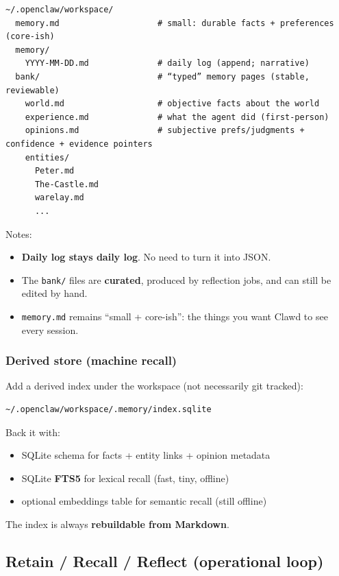 \begin{lstlisting}
~/.openclaw/workspace/
  memory.md                    # small: durable facts + preferences (core-ish)
  memory/
    YYYY-MM-DD.md              # daily log (append; narrative)
  bank/                        # “typed” memory pages (stable, reviewable)
    world.md                   # objective facts about the world
    experience.md              # what the agent did (first-person)
    opinions.md                # subjective prefs/judgments + confidence + evidence pointers
    entities/
      Peter.md
      The-Castle.md
      warelay.md
      ...
\end{lstlisting}


Notes:

\begin{itemize}
  \item \textbf{Daily log stays daily log}. No need to turn it into JSON.
  \item The \texttt{bank/} files are \textbf{curated}, produced by reflection jobs, and can still be edited by hand.
  \item \texttt{memory.md} remains “small + core-ish”: the things you want Clawd to see every session.
\end{itemize}


\subsubsection{Derived store (machine recall)}


Add a derived index under the workspace (not necessarily git tracked):

\begin{lstlisting}
~/.openclaw/workspace/.memory/index.sqlite
\end{lstlisting}


Back it with:

\begin{itemize}
  \item SQLite schema for facts + entity links + opinion metadata
  \item SQLite \textbf{FTS5} for lexical recall (fast, tiny, offline)
  \item optional embeddings table for semantic recall (still offline)
\end{itemize}


The index is always \textbf{rebuildable from Markdown}.

\subsection{Retain / Recall / Reflect (operational loop)}


